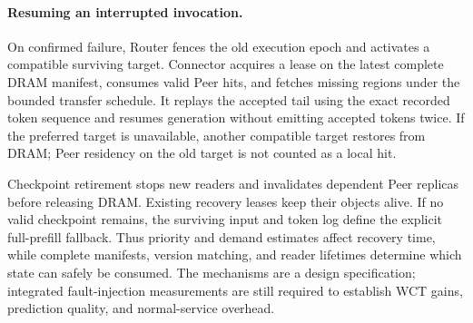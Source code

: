 \paragraph{Resuming an interrupted invocation.}
On confirmed failure, Router fences the old execution epoch and
activates a compatible surviving target. Connector acquires a lease on
the latest complete DRAM manifest, consumes valid Peer hits, and fetches
missing regions under the bounded transfer schedule. It replays the
accepted tail using the exact recorded token sequence and resumes
generation without emitting accepted tokens twice. If the preferred
target is unavailable, another compatible target restores from DRAM;
Peer residency on the old target is not counted as a local hit.

Checkpoint retirement stops new readers and invalidates dependent Peer
replicas before releasing DRAM. Existing recovery leases keep their
objects alive. If no valid checkpoint remains, the surviving input and
token log define the explicit full-prefill fallback. Thus priority and
demand estimates affect recovery time, while complete manifests,
version matching, and reader lifetimes determine which state can safely
be consumed. The mechanisms are a design specification; integrated
fault-injection measurements are still required to establish WCT gains,
prediction quality, and normal-service overhead.
